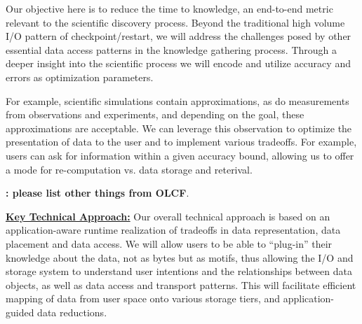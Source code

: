 \documentclass[11pt,letterpaper]{article}
\begin{document}
Our objective here is to reduce the time to knowledge, an end-to-end metric
relevant to the scientific discovery process. Beyond the traditional high
volume I/O pattern of checkpoint/restart, we will address the challenges posed
by other essential data access patterns in the knowledge gathering process.
Through a deeper insight into the scientific process we will encode and utilize
accuracy and errors as optimization parameters. 

For example, scientific simulations contain approximations, as do measurements
from observations and experiments, and depending on the goal, these
approximations are acceptable. We can leverage this observation to optimize the
presentation of data to the user and to implement various tradeoffs. For
example, users can ask for information within a given accuracy bound, allowing
us to offer a mode for re-computation vs. data storage and reterival.

%
{\bf: please list other things from OLCF}.
%


\underline{\textbf{Key Technical Approach:}}
Our overall technical approach is based on an application-aware runtime
realization of tradeoffs in data representation, data placement and data
access. We will allow users to be able to ``plug-in'' their knowledge 
about the data, not as bytes but as motifs, thus allowing the I/O and 
storage system to understand user
intentions and the relationships between data objects, as well as data access
and transport patterns. This will facilitate efficient mapping of data from
user space onto various storage tiers, and application-guided
data reductions.
\end{document}
